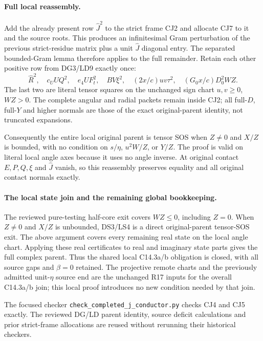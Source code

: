 \paragraph{Full local reassembly.}
Add the already present row $\widehat J^2$ to the strict frame
CJ2 and allocate CJ7 to it and the source roots.  This produces an
infinitesimal Gram perturbation of the previous strict-residue
matrix plus a unit $\widehat J$ diagonal entry.  The separated
bounded-Gram lemma therefore applies to the full remainder.
Retain each other positive row from DG3/LD9 exactly once:
\[
 \widehat R^2,\quad c_UUQ^2,\quad e_4UF_t^2,\quad BV\xi^2,
 \quad(2x/c)uv\tau^2,\quad(G_0x/c)D_0^2WZ.
\]
The last two are literal tensor squares on the unchanged sign chart
$u,v\ge0$, $WZ>0$.  The complete angular and radial packets remain
inside CJ2; all full-$D$, full-$Y$ and higher normals are those of
the exact original-parent identity, not truncated expansions.

Consequently the entire local original parent is tensor SOS when
$Z\ne0$ and $X/Z$ is bounded, with no condition on $s/\eta$,
$u^2W/Z$, or $Y/Z$.  The proof is valid on literal local angle axes
because it uses no angle inverse.  At original contact $E,P,Q,\xi$
and $\widehat J$ vanish, so this reassembly preserves equality and
all original contact normals exactly.

\paragraph{The local state join and the remaining global bookkeeping.}
The reviewed pure-testing half-core exit covers $WZ\le0$, including
$Z=0$.  When $Z\ne0$ and $X/Z$ is unbounded, DS3/LS4 is a direct
original-parent tensor-SOS exit.  The above argument covers every
remaining real state on the local angle chart.  Applying these real
certificates to real and imaginary state parts gives the full complex
parent.  Thus the shared local C14.3a/b obligation is closed, with
all source gaps and $\beta=0$ retained.  The projective remote charts
and the previously admitted unit-$\eta$ source end are the unchanged
R17 inputs for the overall C14.3a/b join; this local proof introduces
no new condition needed by that join.

The focused checker \texttt{check\_completed\_j\_conductor.py}
checks CJ4 and CJ5 exactly.  The reviewed DG/LD parent identity,
source deficit calculations and prior strict-frame allocations are
reused without rerunning their historical checkers.
